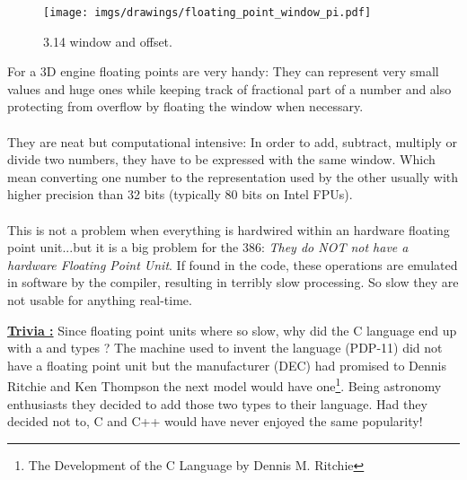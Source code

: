 \documentclass[book.tex]{subfiles}
\begin{document}
\begin{figure}[H]
\centering
\texttt{[image: imgs/drawings/floating\_point\_window\_pi.pdf]}

\caption{3.14 window and offset.}
\label{fig:fp_internals}
\end{figure}
  \bigskip

For a 3D engine floating points are very handy: They can represent very small values and huge ones while keeping track of fractional part of a number and also protecting from overflow by floating the window when necessary.\\
\\
They are neat but computational intensive: In order to add, subtract, multiply or divide two numbers, they have to be expressed with the same window. Which mean converting one number to the representation used by the other usually with higher precision than 32 bits (typically 80 bits on Intel FPUs).\\
\\
This is not a problem when everything is hardwired within an hardware floating point unit...but it is a big problem for the 386: \emph{They do NOT not have a hardware Floating Point Unit}. If found in the code, these operations are emulated in software by the compiler, resulting in terribly slow processing. So slow they are not usable for anything real-time.\\ 
\par


 \textbf{\underline{Trivia :}} Since floating point units where so slow, why did the C language end up with a  and  types ? The machine used to invent the language (PDP-11) did not have a floating point unit but the manufacturer (DEC) had promised to Dennis Ritchie and Ken Thompson the next model would have one\footnote{The Development of the C Language by Dennis M. Ritchie}. Being astronomy enthusiasts they decided to add those two types to their language. Had they decided not to, C and C++ would have never enjoyed the same popularity!\\
\par
\end{document}
